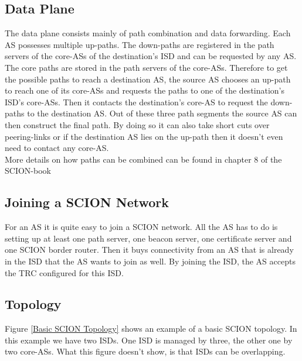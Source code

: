 \subsection{Data Plane}

The data plane consists mainly of path combination and data forwarding. Each \acs{AS} possesses multiple up-paths. The down-paths are registered in the path servers of the core-\acsp{AS} of the destination's \acs{ISD} and can be requested by any \acs{AS}. The core paths are stored in the path servers of the core-\acsp{AS}. Therefore to get the possible paths to reach a destination \acs{AS}, the source \acs{AS} chooses an up-path to reach one of its core-\acsp{AS} and requests the paths to one of the destination's \acs{ISD}'s core-\acsp{AS}. Then it contacts the destination's core-\acs{AS} to request the down-paths to the destination \acs{AS}. Out of these three path segments the source \acs{AS} can then construct the final path. By doing so it can also take short cuts over peering-links or if the destination \acs{AS} lies on the up-path then it doesn't even need to contact any core-\acs{AS}.
\\
More details on how paths can be combined can be found in chapter 8 of the \acs{SCION}-book \cite{perrig2017scion}

\subsection{Joining a SCION Network}
For an \acs{AS} it is quite easy to join a \acs{SCION} network. All the \acs{AS} has to do is setting up at least one path server, one beacon server, one certificate server and one \acs{SCION} border router. Then it buys connectivity from an AS that is already in the \acs{ISD} that the \acs{AS} wants to join as well. By joining the \acs{ISD}, the \acs{AS} accepts the \acs{TRC} configured for this \acs{ISD}.

\newpage

\subsection{Topology}

Figure \ref{Basic SCION Topology} shows an example of a basic \acs{SCION} topology. In this example we have two \aclp{ISD}. One \acs{ISD} is managed by three, the other one by two core-\acsp{AS}. What this figure doesn't show, is that \acsp{ISD} can be overlapping. 

